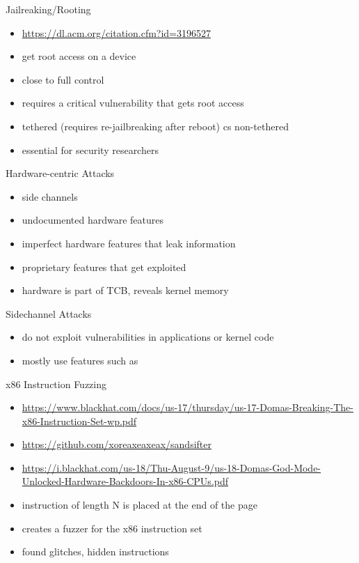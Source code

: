 \documentclass{curs}
\begin{document}
\begin{frame}{Jailreaking/Rooting}
  \begin{itemize}
    \pause \item \url{https://dl.acm.org/citation.cfm?id=3196527}
    \pause \item get root access on a device
    \pause \item close to full control
    \pause \item requires a critical vulnerability that gets root access
    \pause \item tethered (requires re-jailbreaking after reboot) cs non-tethered
    \pause \item essential for security researchers
  \end{itemize}
\end{frame}

\begin{frame}{Hardware-centric Attacks}
  \begin{itemize}
    \pause \item side channels
    \pause \item undocumented hardware features
    \pause \item imperfect hardware features that leak information
    \pause \item proprietary features that get exploited
    \pause \item hardware is part of TCB, reveals kernel memory
  \end{itemize}
\end{frame}

\begin{frame}{Sidechannel Attacks}
  \begin{itemize}
    \pause \item do not exploit vulnerabilities in applications or kernel code
    \pause \item mostly use features such as 
  \end{itemize}
\end{frame}

\begin{frame}{x86 Instruction Fuzzing}
  \begin{itemize}
    \pause \item \url{https://www.blackhat.com/docs/us-17/thursday/us-17-Domas-Breaking-The-x86-Instruction-Set-wp.pdf}
    \pause \item \url{https://github.com/xoreaxeaxeax/sandsifter}
    \pause \item \url{https://i.blackhat.com/us-18/Thu-August-9/us-18-Domas-God-Mode-Unlocked-Hardware-Backdoors-In-x86-CPUs.pdf}
    \pause \item instruction of length N is placed at the end of the page
    \pause \item creates a fuzzer for the x86 instruction set
    \pause \item found glitches, hidden instructions
  \end{itemize}
\end{frame}
\end{document}
